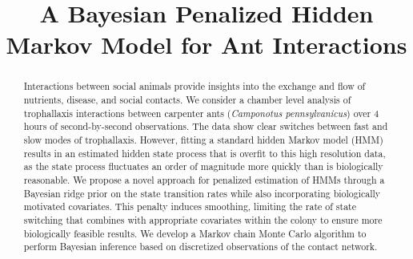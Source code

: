 \documentclass[ba]{imsart}
\begin{document}

\begin{frontmatter}
\title{A Bayesian Penalized Hidden Markov Model for Ant Interactions}



\begin{abstract}
Interactions between social animals provide insights into the exchange and flow of nutrients, disease, and social contacts. We consider a chamber level analysis of trophallaxis interactions between carpenter ants (\textit{Camponotus pennsylvanicus}) over 4 hours of second-by-second observations. The data show clear switches between fast and slow modes of trophallaxis. However, fitting a standard hidden Markov model (HMM) results in an estimated hidden state process that is overfit to this high resolution data, as the state process fluctuates an order of magnitude more quickly than is biologically reasonable.  We propose a novel approach for penalized estimation of HMMs through a Bayesian ridge prior on the state transition rates while also incorporating biologically motivated covariates. This penalty induces smoothing, limiting the rate of state switching that combines with appropriate covariates within the colony to ensure more biologically feasible results. We develop a Markov chain Monte Carlo algorithm to perform Bayesian inference based on discretized observations of the contact network. 
\end{abstract}

\begin{keyword}%
\end{keyword}

\end{frontmatter}
\end{document}
